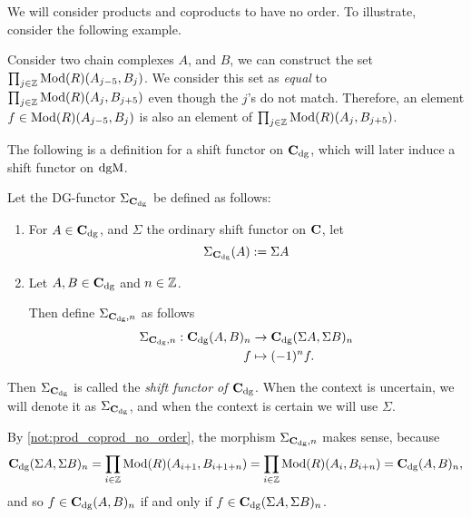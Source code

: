 \begin{notation}
    \label{not:prod_coprod_no_order}
    We will consider products and coproducts to have no order. To illustrate, consider the following example.

    Consider two chain complexes \( A \), and \( B \), we can construct the set \( \prod_{j \in {\mathbb{Z}}} \operatorname{Mod}(R)(A_{j - 5}, B_j) \). We consider this set as \emph{equal} to \( \prod_{j \in {\mathbb{Z}}} \operatorname{Mod}(R)(A_j, B_{j + 5}) \) even though the \( j \)'s do not match. Therefore, an element \( f \in \operatorname{Mod}(R)(A_{j - 5}, B_j) \) is also an element of \( \prod_{j \in {\mathbb{Z}}} \operatorname{Mod}(R)(A_j, B_{j + 5}) \).
\end{notation}

The following is a definition for a shift functor on \( \C_{\dg} \), which will later induce a shift functor on \( \operatorname{dgM} \).

\begin{definition}[Shift in \( \C_{\dg} \)]
    \label{def:sigma_c_dg}
    Let the DG-functor \( \Sigma_{\operatorname{\mathbf{C}}_{\operatorname{dg}}} \) be defined as follows:
    \begin{enumerate}
        \item {
            For \( A \in \operatorname{\mathbf{C}}_{\operatorname{dg}} \), and \( \Sigma \) the ordinary shift functor on \( \operatorname{\mathbf{C}} \), let
            \[
                \Sigma_{\operatorname{\mathbf{C}}_{\operatorname{dg}}}(A) := \Sigma A
            \]
        }
        \item {
            Let \( A, B \in \operatorname{\mathbf{C}}_{\operatorname{dg}} \) and \( n \in {\mathbb{Z}} \).

            Then define \( \Sigma_{\operatorname{\mathbf{C}}_{\operatorname{dg}}, n} \) as follows
            \begin{align*}
                \Sigma_{\operatorname{\mathbf{C}}_{\operatorname{dg}}, n}: \operatorname{\mathbf{C}}_{\operatorname{dg}}(A, B)_n &\to \operatorname{\mathbf{C}}_{\operatorname{dg}}(\Sigma A, \Sigma B)_n \\
                f &\mapsto (-1)^n f.
            \end{align*}
        }
    \end{enumerate}
    Then \( \Sigma_{\operatorname{\mathbf{C}}_{\operatorname{dg}}} \) is called the \emph{shift functor of \( \C_{\dg} \)}. When the context is uncertain, we will denote it as \( \Sigma_{\operatorname{\mathbf{C}}_{\operatorname{dg}}} \), and when the context is certain we will use \( \Sigma \).
\end{definition}

By \autoref{not:prod_coprod_no_order}, the morphism \( \Sigma_{\operatorname{\mathbf{C}}_{\operatorname{dg}}, n} \) makes sense, because
\[
    \operatorname{\mathbf{C}}_{\operatorname{dg}}(\Sigma A, \Sigma B)_n  = \prod_{i \in {\mathbb{Z}}} \operatorname{Mod}(R)(A_{i + 1}, B_{i + 1 + n}) = \prod_{i \in {\mathbb{Z}}} \operatorname{Mod}(R)(A_i, B_{i + n}) = \operatorname{\mathbf{C}}_{\operatorname{dg}}(A, B)_n,
\]
and so \( f \in \operatorname{\mathbf{C}}_{\operatorname{dg}}(A, B)_n \) if and only if \( f \in \operatorname{\mathbf{C}}_{\operatorname{dg}}(\Sigma A, \Sigma B)_n \).

